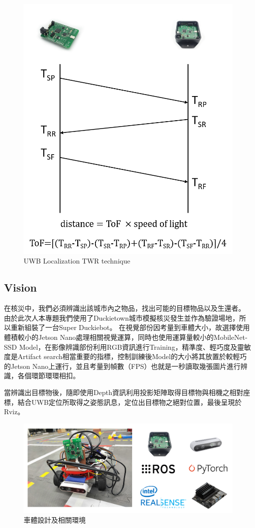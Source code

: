 \begin{figure}[h]
  \centering
    \includegraphics[width=\columnwidth]{images/uwb_tech.png}
        \caption{UWB Localization TWR technique}
 \label{figure:uwb_tech}
\end{figure}

\subsection{Vision}
在核災中，我們必須辨識出該城市內之物品，找出可能的目標物品以及生還者。
由於此次人本專題我們使用了Duckietown城市模擬核災發生並作為驗證場地，所以重新組裝了一台Super Duckiebot。
在視覺部份因考量到車體大小，故選擇使用體積較小的Jetson Nano處理相關視覺運算，同時也使用運算量較小的MobileNet-SSD Model，在影像辨識部份利用RGB資訊進行Training，精準度、輕巧度及靈敏度是Artifact search相當重要的指標，控制訓練後Model的大小將其放置於較輕巧的Jetson Nano上運行，並且考量到幀數（FPS）也就是一秒讀取幾張圖片進行辨識，各個環節環環相扣。

當辨識出目標物後，隨即使用Depth資訊利用投影矩陣取得目標物與相機之相對座標，結合UWB定位所取得之姿態訊息，定位出目標物之絕對位置，最後呈現於Rviz。

\begin{figure}[h]
  \centering
    \includegraphics[width=\columnwidth]{images/car.png}
        \caption{車體設計及相關環境}
 \label{figure:car}
\end{figure}









